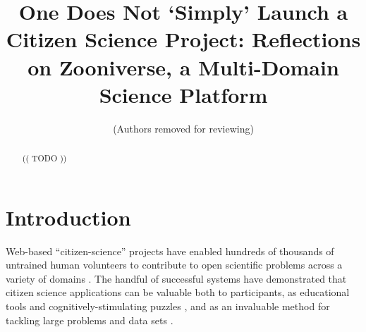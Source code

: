 \documentclass{sigchi}
\begin{document}
\title{One Does Not `Simply' Launch a Citizen Science Project: Reflections on Zooniverse, a Multi-Domain Science Platform}

 \author{ (Authors removed for reviewing) }
% 
% 
% 


\maketitle

\begin{abstract}

(( TODO ))

\end{abstract}




\section{Introduction}

Web-based ``citizen-science'' projects have enabled hundreds of thousands of untrained human volunteers to contribute to open scientific problems across a variety of domains \cite{citizen-science}.  The handful of successful systems have demonstrated that citizen science applications can be valuable both to participants, as educational tools and cognitively-stimulating puzzles \cite{citizen-science-in-curricula}, 
and as an invaluable method for tackling large problems and data sets \cite{fortson-2011, lintott-08, lintott-11, simpson-12, davis-11}.


\end{document}
